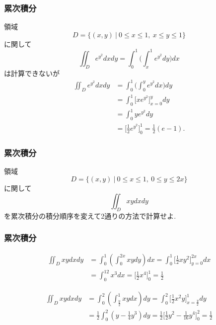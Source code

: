 


\begin{frame}
\frametitle{累次積分}

領域
$$
D=\{(x,y) \ | \ 0 \le x \le 1, \ x\le y \le 1\}
$$
に関して
$$
\iint_D e^{y^2} dxdy = \int_0^1 \big(\int_x^1 e^{y^2}dy\big)dx
$$
は計算できないが
\begin{align*}
\iint_D e^{y^2} dxdy &= \int_0^1 \big(\int_0^y e^{y^2}dx\big)dy \\
& = \int_0^1\big[xe^{y^2}\big]_{x=0}^ydy \\
& = \int_0^1ye^{y^2}dy \\
& = \big[\frac{1}{2}e^{y^2}\big]_0^1=\frac{1}{2}(e-1). 
\end{align*}


\end{frame}





\begin{frame}
\frametitle{累次積分}

\begin{Prob}
領域
$$
D=\{(x,y) \ | \ 0 \le x \le 1, \ 0\le y \le 2x\}
$$
に関して
$$
\iint_D xy dxdy 
$$
を累次積分の積分順序を変えて2通りの方法で計算せよ. 
\end{Prob}

\end{frame}





\begin{frame}
\frametitle{累次積分}

\begin{align*}
\iint_D xy dxdy & = \int_0^1 (\int_0^{2x} xydy)dx = \int_0^1 \big[\frac{1}{2}xy^2\big]_{y=0}^{2x}dx \\
& = \int_0^12x^3 dx= \big[\frac{1}{2}x^4\big]_0^1=\frac{1}{2}
\end{align*}

\begin{align*}
\iint_D xy dxdy & = \int_0^2 (\int_{\frac{y}{2}}^{1} xydx)dy 
 = \int_0^2 \big[\frac{1}{2}x^2y \big]_{x=\frac{y}{2}}^{1}dy \\
 & = \frac{1}{2}\int_0^2 (y-\frac{1}{4}y^3)dy = \frac{1}{2}\big[\frac{1}{2}y^2- \frac{1}{16}y^4\big]_0^2=\frac{1}{2}
\end{align*}

\end{frame}

